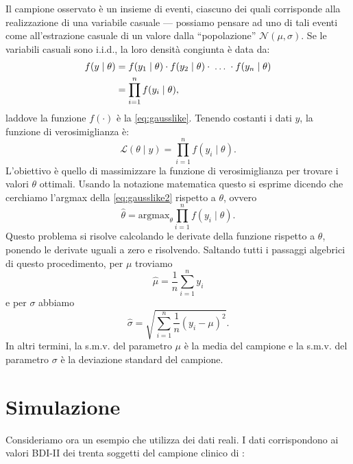 \documentclass[
  10pt,
  italian,
  a4paper,
  extrafontsizes,onecolumn,openright
  ]{memoir}
\theoremstyle{definition}
\theoremstyle{definition}
\theoremstyle{definition}
\theoremstyle{definition}
\theoremstyle{remark}
\begin{document}
Il campione osservato è un insieme di eventi, ciascuno dei quali corrisponde alla realizzazione di una variabile casuale --- possiamo pensare ad uno di tali eventi come all'estrazione casuale di un valore dalla ``popolazione'' \(\mathcal{N}(\mu, \sigma)\). Se le variabili casuali sono i.i.d., la loro densità congiunta è data da:
\begin{align}
f(y \mid \theta) &= f(y_1 \mid \theta) \cdot f(y_2 \mid \theta) \cdot \; \dots \; \cdot f(y_n \mid \theta)\notag\\
                 &= \prod_{i=1}^n f(y_i \mid \theta),
\label{eq:gauss-prob-cong}
\end{align}
\noindent
laddove la funzione \(f(\cdot)\) è la \eqref{eq:gausslike}. Tenendo costanti i dati \(y\), la funzione di verosimiglianza è:
\begin{equation}
\mathcal{L}(\theta \mid y) = \prod_{i=1}^n f(y_i \mid \theta).
\label{eq:gausslike2}
\end{equation}
L'obiettivo è quello di massimizzare la funzione di verosimiglianza per trovare i valori \(\theta\) ottimali. Usando la notazione matematica questo si esprime dicendo che cerchiamo l'argmax della \eqref{eq:gausslike2} rispetto a \(\theta\), ovvero
\[
\hat{\theta} = \text{argmax}_{\theta} \prod_{i=1}^n f(y_i \mid \theta).
\]
Questo problema si risolve calcolando le derivate della funzione rispetto a \(\theta\), ponendo le derivate uguali a zero e risolvendo. Saltando tutti i passaggi algebrici di questo procedimento, per \(\mu\) troviamo
\begin{equation}
\hat{\mu} = \frac{1}{n} \sum_{i=1}^n y_i
\label{eq:maxlikemu}
\end{equation}
e per \(\sigma\) abbiamo
\begin{equation}
\hat{\sigma} = \sqrt{\sum_{i=1}^n\frac{1}{n}(y_i- \mu)^2}.
\label{eq:maxlikesigma}
\end{equation}
In altri termini, la s.m.v. del parametro \(\mu\) è la media del campione e la s.m.v. del parametro \(\sigma\) è la deviazione standard del campione.

\hypertarget{simulazione}{%
\section*{Simulazione}\label{simulazione}}

Consideriamo ora un esempio che utilizza dei dati reali. I dati corrispondono ai valori BDI-II dei trenta soggetti del campione clinico di \textcite{zetschefuture2019}:
\end{document}
